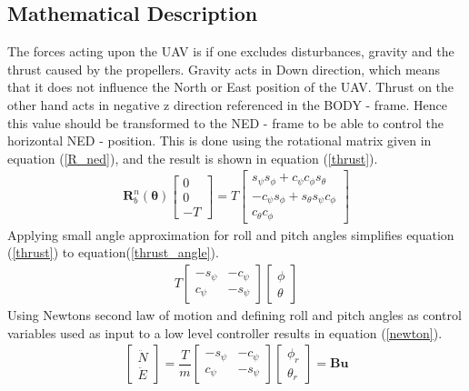 \subsection{Mathematical Description}
The forces acting upon the UAV is if one excludes disturbances, gravity and the thrust caused by the propellers. Gravity acts in Down direction, which means that it does not influence the North or East position of the UAV. Thrust on the other hand acts in negative z direction referenced in the BODY - frame. Hence this value should be transformed to the NED - frame to be able to control the horizontal NED - position. This is done using the rotational matrix given in equation (\ref{R_ned}), and the result is shown in equation (\ref{thrust}).
\begin{eqnarray}
\boldsymbol{R}_b^n(\boldsymbol{\theta})\begin{bmatrix}
0\\
0\\
-T
\end{bmatrix}
= T \begin{bmatrix}
s_\psi s_\phi + c_\psi c_\phi s_\theta\\
-c_\psi s_\phi + s_\theta s_\psi c_\phi\\
c_\theta c_\phi
\end{bmatrix}
\label{thrust}
\end{eqnarray}
Applying small angle approximation for roll and pitch angles simplifies equation (\ref{thrust}) to equation(\ref{thrust_angle}).
\begin{eqnarray}
T \begin{bmatrix}
-s_\psi & -c_\psi\\
c_\psi & -s_\psi
\end{bmatrix}
\begin{bmatrix}
\phi\\
\theta
\end{bmatrix}
\label{thrust_angle}
\end{eqnarray}
Using Newtons second law of motion and defining roll and pitch angles as control variables used as input to a low level controller results in equation (\ref{newton}).
\begin{eqnarray}
\begin{bmatrix}
\ddot{N}\\
\ddot{E}
\end{bmatrix}
= \dfrac{T}{m}\begin{bmatrix}
-s_\psi & -c_\psi\\
c_\psi & -s_\psi
\end{bmatrix}
\begin{bmatrix}
\phi_r\\
\theta_r
\end{bmatrix}
= \boldsymbol{B}\boldsymbol{u}
\label{newton}
\end{eqnarray}
